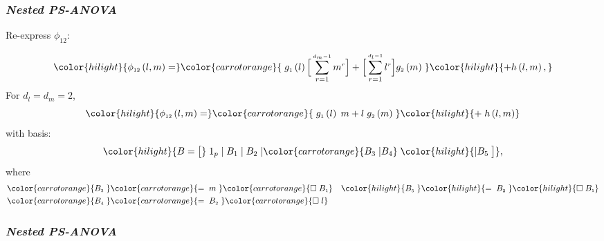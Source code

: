\documentclass[12pt]{beamer}
\newcommand{\newmaththought}[1]{{ \color{hilight} {#1}}}
\newcommand{\carrotorangemath}[1]{{ \color{carrotorange} {#1}}}
\newcommand{\ms}{\scriptscriptstyle}
\begin{document}
\begin{frame}
\frametitle{\emph{Nested PS-ANOVA}}

Re-express $\phi_{\ms{12}}$:

\begin{align*}
\newmaththought{ \phi_{\ms{12}}\left(l,m\right)  =} \carrotorangemath{\; g_{\ms 1}\left(l\right) \Big[ \sum_{r=1}^{\ms{d_m-1}} m^{\ms r}\Big] + \Big[ \sum_{r=1}^{\ms{d_l-1}} l^{\ms r} \Big] g_{\ms 2}\left(m\right)\;}  \newmaththought{+ h\left( l,m \right), } 
\end{align*}
\noindent
For $d_l = d_m = 2$,
\[
\newmaththought{ \phi_{\ms{12}}\left(l,m\right)  =} \carrotorangemath{\; g_{\ms 1}\left(l\right) \; m+ l \; g_{\ms 2}\left(m\right)\;}\newmaththought{ + \; h\left( l,m \right) } 
\]
with basis:
\begin{equation} \label{eq:nested-SANOVA-basis-matrix}
\color{hilight}{B = \big[ } \; 1_p \; \vert \;  B_1  \; \vert \;   B_2 \; \vert \carrotorangemath{ B_3 \; \vert B_4 }\;\newmaththought{ \vert B_5 \; \big]},
\end{equation}
\noindent
where
\begin{align*}
\carrotorangemath{B_{\ms 3}\;} &\carrotorangemath{= \;m \;} \carrotorangemath{ \square \;  B_{\ms 1}}  &  \newmaththought{B_{\ms 5}\;}\newmaththought{=\; B_{\ms 2} \;} \newmaththought{ \square \; B_{\ms 1} } \\
 \carrotorangemath{B_{\ms 4}\;}&\carrotorangemath{=\; B_{\ms 2} \;} \carrotorangemath{ \square \; l } &
\end{align*}


\end{frame}




\begin{frame}
\frametitle{\emph{Nested PS-ANOVA}}



\end{frame}
\end{document}
